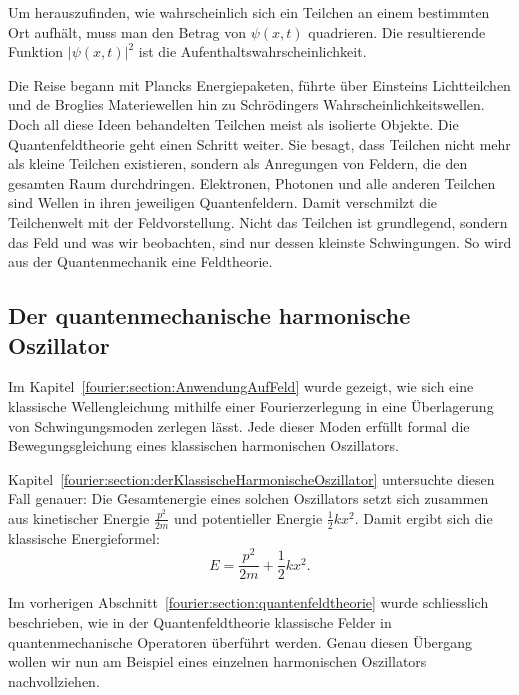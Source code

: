 	
	Um herauszufinden, wie wahrscheinlich sich ein Teilchen an einem bestimmten Ort aufhält, muss man den Betrag von $\psi(x, t)$ quadrieren. 
	Die resultierende Funktion $|\psi(x, t)|^2$ ist die Aufenthaltswahrscheinlichkeit. 
	
	Die Reise begann mit Plancks Energiepaketen, führte über Einsteins Lichtteilchen und de Broglies Materiewellen hin zu Schrödingers Wahrscheinlichkeitswellen. 
	Doch all diese Ideen behandelten Teilchen meist als isolierte Objekte.
	Die Quantenfeldtheorie geht einen Schritt weiter.
	Sie besagt, dass Teilchen nicht mehr als kleine Teilchen existieren, sondern als Anregungen von Feldern, die den gesamten Raum durchdringen. 
	Elektronen, Photonen und alle anderen Teilchen sind Wellen in ihren jeweiligen Quantenfeldern.
	Damit verschmilzt die Teilchenwelt mit der Feldvorstellung.
	Nicht das Teilchen ist grundlegend, sondern das Feld und was wir beobachten, sind nur dessen kleinste Schwingungen.
	So wird aus der Quantenmechanik eine Feldtheorie.
	
	\subsection{Der quantenmechanische harmonische Oszillator\label{fourier:subsection:derQMHarmonischeOszillator}}

	Im Kapitel~\ref{fourier:section:AnwendungAufFeld} wurde gezeigt, wie sich eine klassische Wellengleichung mithilfe einer Fourierzerlegung in eine Überlagerung von Schwingungsmoden zerlegen lässt.
	Jede dieser Moden erfüllt formal die Bewegungsgleichung eines klassischen harmonischen Oszillators.

	Kapitel~\ref{fourier:section:derKlassischeHarmonischeOszillator} untersuchte diesen Fall genauer:
	Die Gesamtenergie eines solchen Oszillators setzt sich zusammen aus kinetischer Energie \( \frac{p^2}{2m} \) und potentieller Energie \( \frac{1}{2}kx^2 \).
	Damit ergibt sich die klassische Energieformel:
	\begin{equation}
	E = \frac{p^2}{2m} + \frac{1}{2}kx^2.
	\end{equation}

	Im vorherigen Abschnitt~\ref{fourier:section:quantenfeldtheorie} wurde schliesslich beschrieben, wie in der Quantenfeldtheorie klassische Felder in quantenmechanische Operatoren überführt werden.
	Genau diesen Übergang wollen wir nun am Beispiel eines einzelnen harmonischen Oszillators nachvollziehen.

	\vspace{1em}

